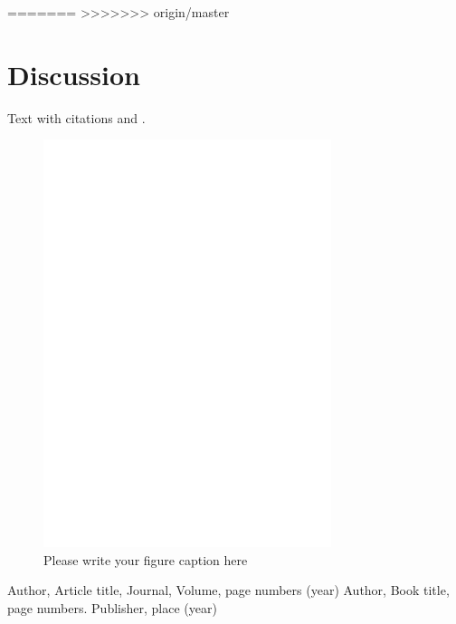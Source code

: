 =======
>>>>>>> origin/master
\section{Discussion}
\label{sec:4}
Text with citations \cite{RefB} and \cite{RefJ}.

%
\begin{figure}
  \includegraphics[width=0.75\textwidth]{bfeed_mob}
\caption{Please write your figure caption here}
\label{fig:2}       %
\end{figure}
%





\begin{thebibliography}{}
%
%
Author, Article title, Journal, Volume, page numbers (year)
Author, Book title, page numbers. Publisher, place (year)
\end{thebibliography}



